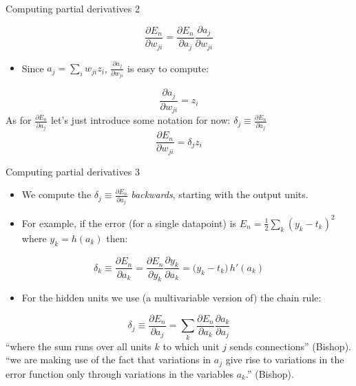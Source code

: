 \documentclass[10pt]{beamer}
\begin{document}
\begin{titledslide}{Computing partial derivatives 2}

  \[
    \frac{\partial E_{n}}{\partial w_{ji}} =     \frac{\partial E_{n}}{\partial a_{j}}\frac{\partial a_{j}}{\partial w_{ji}}
  \]
  \begin{itemize}
  \item Since  $a_{j}  = \sum_{i}w_{ji}z_{i} $, $\frac{\partial a_{j}}{\partial w_{ji}}$ is easy to compute:
  \end{itemize}
  \[
    \frac{\partial a_{j}}{\partial w_{ji}} = z_{i}
  \]
  As for $\frac{\partial E_{n}}{\partial a_{j}}$ let's just introduce
  some notation for now: $\delta_{j} \equiv \frac{\partial E_{n}}{\partial a_{j}}$
  \begin{equation}
    \label{eq:dz}
    \frac{\partial E_{n}}{\partial w_{ji}} = \delta_{j}z_{i}
  \end{equation}

\end{titledslide}
\begin{titledslide}{Computing partial derivatives 3}

  \begin{itemize}
  \item We compute the $\delta_{j} \equiv \frac{\partial
      E_{n}}{\partial a_{j}}$ \emph{backwards}, starting with the
    output units.
  \item For example, if the error (for a single datapoint) is $E_{n} =
    \frac{1}{2}\sum_{k} (y_{k}-t_{k})^{2}$ where $y_k=h(a_k)$ then:
  \end{itemize}
  \begin{equation}
    \label{eq:outgrad}
\delta_k \equiv 
\frac{\partial E_n}{\partial a_k}
=
\frac{\partial E_n}{\partial y_k}
\frac{\partial y_k}{\partial a_k}
=
\bigl(y_k - t_k\bigr)\, h'(a_k)
  \end{equation}
  \begin{itemize}
  \item For the hidden units we use (a multivariable version of) the chain rule:
  \end{itemize}
  \[
    \delta_{j} \equiv \frac{\partial E_{n}}{\partial a_{j}} = \sum_{k} \frac{\partial E_{n}}{\partial a_{k}}\frac{\partial a_{k}}{\partial a_{j}} 
  \]
  ``where the sum runs over all units $k$ to which unit $j$ sends
  connections'' (Bishop). ``we are
making use of the fact that variations in $a_j$ give rise to
variations in the error function only through variations in the
variables $a_k$.'' (Bishop).
\end{titledslide}
\end{document}

